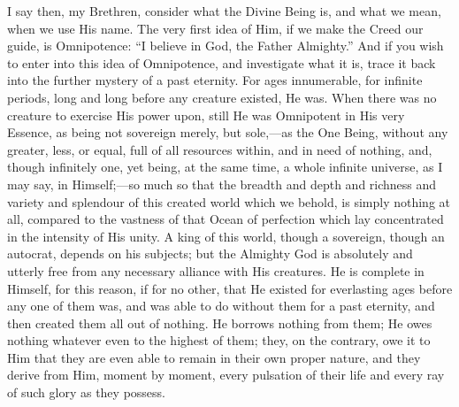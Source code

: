 I say then, my Brethren, consider what the Divine
Being is, and what we mean, when we use His name. The
very first idea of Him, if we make the Creed our guide,
is Omnipotence: ``I believe in God, the Father Almighty.'' And if you wish to enter into this idea
of Omnipotence, and investigate what it is, trace it back
into the further mystery of a past eternity. For ages
innumerable, for infinite periods, long and long before
any creature existed, He was. When there was no creature
to exercise His power upon, still He was Omnipotent in
His very Essence, as being not sovereign merely, but
sole,—as the One Being, without any greater, less,
or equal, full of all resources within, and in need of
nothing, and, though infinitely one, yet being, at the
same time, a whole infinite universe, as I may say, in
Himself;—so much so that the breadth and depth and
richness and variety and splendour of this created world
which we behold, is simply nothing at all, compared to
the vastness of that Ocean of perfection which lay
concentrated in the intensity of His unity. A king of
this world, though a sovereign, though an autocrat,
depends on his subjects; but the Almighty God is
absolutely and utterly free from any necessary alliance
with His creatures. He is complete in Himself, for this
reason, if for no other, that He existed for everlasting
ages before any one of them was, and was able to do
without them for a past eternity, and then created them
all out of nothing. He borrows nothing from them; He owes
nothing whatever even to the highest of them; they, on
the contrary, owe it to Him that they are even able to
remain in their own proper nature, and they derive from
Him, moment by moment, every pulsation of their life and
every ray of such glory as they possess.

